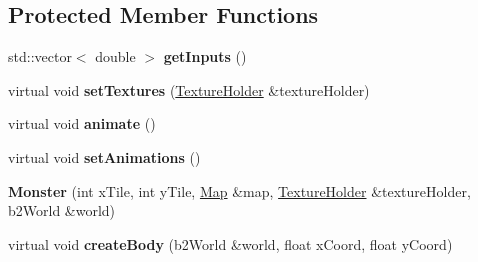 \subsection*{Protected Member Functions}
\begin{DoxyCompactItemize}
\item 
\hypertarget{class_monster_a88596b981f071c8deec021966bcd2644}{std\-::vector$<$ double $>$ {\bfseries get\-Inputs} ()}\label{class_monster_a88596b981f071c8deec021966bcd2644}

\item 
\hypertarget{class_monster_a8d9f9ec59c821c786318cba7118330de}{virtual void {\bfseries set\-Textures} (\hyperlink{class_texture_holder}{Texture\-Holder} \&texture\-Holder)}\label{class_monster_a8d9f9ec59c821c786318cba7118330de}

\item 
\hypertarget{class_monster_adad8414146dd91707a451f5d153d12fb}{virtual void {\bfseries animate} ()}\label{class_monster_adad8414146dd91707a451f5d153d12fb}

\item 
\hypertarget{class_monster_a932cd4f0fc8044cc873e5550b3cf10c3}{virtual void {\bfseries set\-Animations} ()}\label{class_monster_a932cd4f0fc8044cc873e5550b3cf10c3}

\item 
\hypertarget{class_monster_a1bfc08ef5073ae736ffad4de8844bbf4}{{\bfseries Monster} (int x\-Tile, int y\-Tile, \hyperlink{class_map}{Map} \&map, \hyperlink{class_texture_holder}{Texture\-Holder} \&texture\-Holder, b2\-World \&world)}\label{class_monster_a1bfc08ef5073ae736ffad4de8844bbf4}

\item 
\hypertarget{class_monster_a802abc56224cd726540cecc3e6221cf1}{virtual void {\bfseries create\-Body} (b2\-World \&world, float x\-Coord, float y\-Coord)}\label{class_monster_a802abc56224cd726540cecc3e6221cf1}

\end{DoxyCompactItemize}
